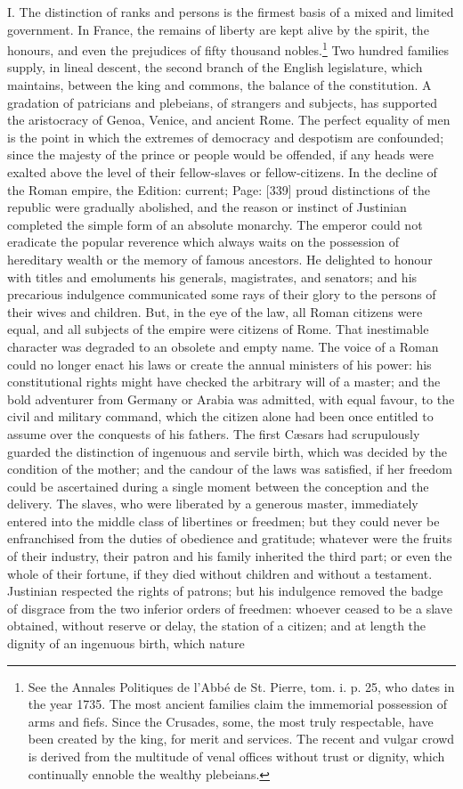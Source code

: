 I. The distinction of ranks and persons is the firmest basis of a mixed and limited government. In France, the remains of liberty are kept alive by the spirit, the honours, and even the prejudices of fifty thousand nobles.\footnote{See the Annales Politiques de l\texthebrew{}’Abbé de St. Pierre, tom. i. p. 25, who dates in the year 1735. The most ancient families claim the immemorial possession of arms and fiefs. Since the Crusades, some, the most truly respectable, have been created by the king, for merit and services. The recent and vulgar crowd is derived from the multitude of venal offices without trust or dignity, which continually ennoble the wealthy plebeians.} Two hundred families supply, in lineal descent, the second branch of the English legislature, which maintains, between the king and commons, the balance of the constitution. A gradation of patricians and plebeians, of strangers and subjects, has supported the aristocracy of Genoa, Venice, and ancient Rome. The perfect equality of men is the point in which the extremes of democracy and despotism are confounded; since the majesty of the prince or people would be offended, if any heads were exalted above the level of their fellow-slaves or fellow-citizens. In the decline of the Roman empire, the Edition: current; Page: [339] proud distinctions of the republic were gradually abolished, and the reason or instinct of Justinian completed the simple form of an absolute monarchy. The emperor could not eradicate the popular reverence which always waits on the possession of hereditary wealth or the memory of famous ancestors. He delighted to honour with titles and emoluments his generals, magistrates, and senators; and his precarious indulgence communicated some rays of their glory to the persons of their wives and children. But, in the eye of the law, all Roman citizens were equal, and all subjects of the empire were citizens of Rome. That inestimable character was degraded to an obsolete and empty name. The voice of a Roman could no longer enact his laws or create the annual ministers of his power: his constitutional rights might have checked the arbitrary will of a master; and the bold adventurer from Germany or Arabia was admitted, with equal favour, to the civil and military command, which the citizen alone had been once entitled to assume over the conquests of his fathers. The first Cæsars had scrupulously guarded the distinction of ingenuous and servile birth, which was decided by the condition of the mother; and the candour of the laws was satisfied, if her freedom could be ascertained during a single moment between the conception and the delivery. The slaves, who were liberated by a generous master, immediately entered into the middle class of libertines or freedmen; but they could never be enfranchised from the duties of obedience and gratitude; whatever were the fruits of their industry, their patron and his family inherited the third part; or even the whole of their fortune, if they died without children and without a testament. Justinian respected the rights of patrons; but his indulgence removed the badge of disgrace from the two inferior orders of freedmen: whoever ceased to be a slave obtained, without reserve or delay, the station of a citizen; and at length the dignity of an ingenuous birth, which nature 